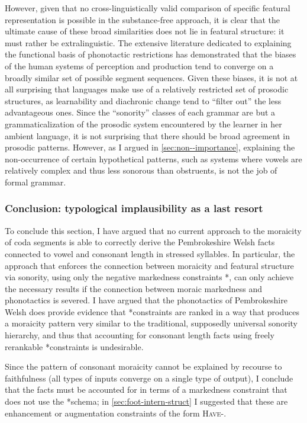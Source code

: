 However, given that no cross\hyp linguistically valid comparison of specific featural representation is possible in the substance\hyp free approach, it is clear that the ultimate cause of these broad similarities does not lie in featural structure: it must rather be extralinguistic. The extensive literature dedicated to explaining the functional basis of phonotactic restrictions \citep[\egm][]{mattingly81:_phonet,ohala90:_alter,silverman,steriade01,wright,gordon06:_syllab} has demonstrated that the biases of the human systems of perception and production tend to converge on a broadly similar set of possible segment sequences. Given these biases, it is not at all surprising that languages make use of a relatively restricted set of prosodic structures, as learnability and diachronic change tend to \enquote{filter out} the less advantageous ones. Since the \enquote{sonority} classes of each grammar are but a grammaticalization of the prosodic system encountered by the learner in her ambient language, it is not surprising that there should be broad agreement in prosodic patterns. However, as I argued in \cref{sec:non--importance}, explaining the non\hyp occurrence of certain hypothetical patterns, such as systems where vowels are relatively complex and thus less sonorous than obstruents, is not the job of formal grammar.

\subsubsection{Conclusion: typological implausibility as a last resort}
\label{sec:concl-typol-impl}

To conclude this section, I have argued that no current approach to the moraicity of coda segments is able to correctly derive the Pembrokeshire Welsh facts connected to vowel and consonant length in stressed syllables. In particular, the approach that enforces the connection between moraicity and featural structure via sonority, using only the negative markedness constraints *\mo[F], can only achieve the necessary results if the connection between moraic markedness and phonotactics is severed. I have argued that the phonotactics of Pembrokeshire Welsh does provide evidence that *\mo[F] constraints are ranked in a way that produces a moraicity pattern very similar to the traditional, supposedly universal sonority hierarchy, and thus that accounting for consonant length facts using freely rerankable *\mo[F] constraints is undesirable.

Since the pattern of consonant moraicity cannot be explained by recourse to faithfulness (\ie all types of inputs converge on a single type of output), I conclude that the facts must be accounted for in terms of a markedness constraint that does not use the *\mo[F] schema; in \cref{sec:foot-intern-struct} I suggested that these are enhancement or augmentation constraints of the form \textsc{Have}-\mo[F].

